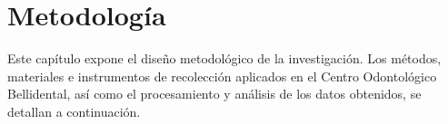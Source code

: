 \section{Metodología}

Este capítulo expone el diseño metodológico de la investigación. Los métodos, materiales e instrumentos de recolección aplicados en el Centro Odontológico Bellidental, así como el procesamiento y análisis de los datos obtenidos, se detallan a continuación.